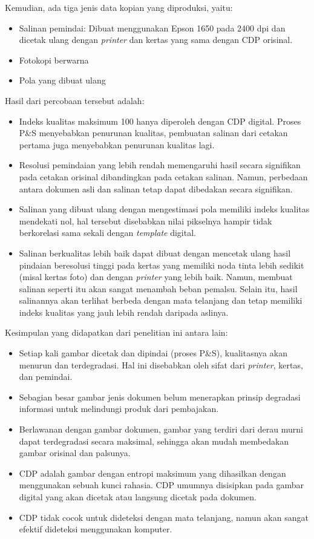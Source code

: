 \noindent Kemudian, ada tiga jenis data kopian yang diproduksi, yaitu:
\begin{itemize}
	\item Salinan pemindai: Dibuat menggunakan Epson 1650 pada 2400 dpi dan dicetak ulang dengan \emph{printer} dan kertas yang sama dengan CDP orisinal.
	\item Fotokopi berwarna
	\item Pola yang dibuat ulang
\end{itemize}

\noindent Hasil dari percobaan tersebut adalah:
\begin{itemize}
	\item Indeks kualitas maksimum 100 hanya diperoleh dengan CDP digital. Proses P\&S menyebabkan penurunan kualitas, pembuatan salinan dari cetakan pertama juga
	      menyebabkan penurunan kualitas lagi.
	\item Resolusi pemindaian yang lebih rendah memengaruhi hasil secara signifikan pada cetakan orisinal dibandingkan pada cetakan salinan. Namun, perbedaan antara
	      dokumen asli dan salinan tetap dapat dibedakan secara signifikan.
	\item Salinan yang dibuat ulang dengan mengestimasi pola memiliki indeks kualitas mendekati nol, hal tersebut disebabkan nilai pikselnya hampir tidak berkorelasi
	      sama sekali dengan \emph{template} digital.
	\item Salinan berkualitas lebih baik dapat dibuat dengan mencetak ulang hasil pindaian beresolusi tinggi pada kertas yang memiliki noda tinta lebih sedikit (misal
	      kertas foto) dan dengan \emph{printer} yang lebih baik. Namun, membuat salinan seperti itu akan sangat menambah beban pemalsu. Selain itu, hasil salinannya
	      akan terlihat berbeda dengan mata telanjang dan tetap memiliki indeks kualitas yang jauh lebih rendah daripada aslinya.
\end{itemize}

\noindent Kesimpulan yang didapatkan dari penelitian ini \cite{picard2004digital} antara lain:
\begin{itemize}
	\item Setiap kali gambar dicetak dan dipindai (proses P\&S), kualitasnya akan menurun dan terdegradasi. Hal ini disebabkan oleh sifat dari \emph{printer}, kertas,
	      dan pemindai.
	\item Sebagian besar gambar jenis dokumen belum menerapkan prinsip degradasi informasi untuk melindungi produk dari pembajakan.
	\item Berlawanan dengan gambar dokumen, gambar yang terdiri dari derau murni dapat terdegradasi secara maksimal, sehingga akan mudah membedakan gambar orisinal dan
	      palsunya.
	\item CDP adalah gambar dengan entropi maksimum yang dihasilkan dengan menggunakan sebuah kunci rahasia. CDP umumnya disisipkan pada gambar digital yang akan dicetak
	      atau langsung dicetak pada dokumen.
	\item CDP tidak cocok untuk dideteksi dengan mata telanjang, namun akan sangat efektif dideteksi menggunakan komputer.
\end{itemize}

